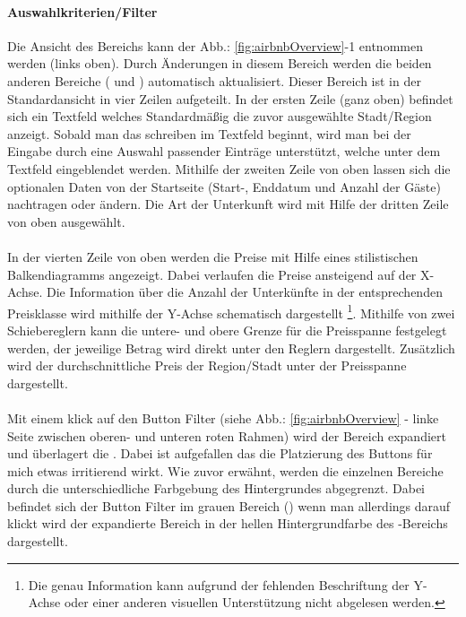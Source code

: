 \documentclass[../Bachelorarbeit.tex]{subfiles}
\begin{document}
\paragraph{Auswahlkriterien/Filter}
\label{airbnb:filter}
Die Ansicht des Bereichs  kann der Abb.: \ref{fig:airbnbOverview}-1 entnommen werden (links oben).
Durch Änderungen in diesem Bereich werden die beiden anderen Bereiche ( und ) automatisch aktualisiert. 
Dieser Bereich ist in der Standardansicht in vier Zeilen aufgeteilt. 
In der ersten Zeile (ganz oben) befindet sich ein Textfeld welches Standardmäßig die zuvor ausgewählte Stadt/Region anzeigt. 
Sobald man das schreiben im Textfeld beginnt, wird man bei der Eingabe durch eine Auswahl passender Einträge unterstützt, welche unter dem Textfeld eingeblendet werden.
Mithilfe der zweiten Zeile von oben lassen sich die optionalen Daten von der Startseite (Start-, Enddatum und Anzahl der Gäste) nachtragen oder ändern.
Die Art der Unterkunft wird mit Hilfe der dritten Zeile von oben ausgewählt.\\
\\
In der vierten Zeile von oben werden die Preise mit Hilfe eines stilistischen Balkendiagramms angezeigt. Dabei verlaufen die Preise ansteigend auf der X-Achse.
Die Information über die Anzahl der Unterkünfte in der entsprechenden Preisklasse wird mithilfe der Y-Achse schematisch dargestellt
\footnote{Die genau Information kann aufgrund der fehlenden Beschriftung der Y-Achse oder einer anderen visuellen Unterstützung nicht abgelesen werden.
	}.
Mithilfe von zwei Schiebereglern kann die untere- und obere Grenze für die Preisspanne festgelegt werden, der jeweilige Betrag wird direkt unter den Reglern dargestellt.
Zusätzlich wird der durchschnittliche Preis der Region/Stadt unter der Preisspanne dargestellt.\\
\\
Mit einem klick auf den Button Filter (siehe Abb.: \ref{fig:airbnbOverview} - linke Seite zwischen oberen- und unteren roten Rahmen) wird der Bereich  expandiert und überlagert die  .
Dabei ist aufgefallen das die Platzierung des Buttons für mich etwas irritierend wirkt. 
Wie zuvor erwähnt, werden die einzelnen Bereiche durch die unterschiedliche Farbgebung des Hintergrundes abgegrenzt. 
Dabei befindet sich der Button Filter im grauen Bereich () wenn man allerdings darauf klickt wird der expandierte Bereich in der hellen Hintergrundfarbe des -Bereichs dargestellt.
\end{document}
